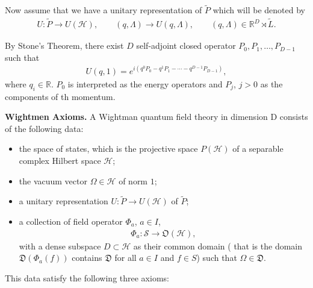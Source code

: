 \documentclass[a4paper,10pt]{amsart}
\newcommand{\HHH}{\mathcal H} %
\newcommand{\SSS}{\mathcal S}
\newcommand{\DDD}{\mathfrak D}
\newcommand{\PPP}{\widetilde{P}}
\newcommand{\LLL}{\widetilde{L}}
\newcommand{\R}{\mathbb R}  %
\begin{document}
Now assume that we have a unitary representation of $\PPP$ which will be 
denoted by
\begin{align*}
    U : \PPP \to U(\HHH), \qquad (q, \Lambda) \to U(q, \Lambda), 
    \qquad (q, \Lambda) \in \R^{D} \rtimes \LLL.
\end{align*}

By Stone's Theorem, there exist $D$ self-adjoint closed operator
$P_0, P_1, \ldots, P_{D-1}$ such that
\begin{align*}
    U(q, 1) = e^{i(q^{0}P_{0} - q^{1}P_1 - \cdots - q^{D-1}P_{D-1})},
\end{align*}
where $q_i \in \R$. $P_0$ is interpreted as the energy operators 
and $P_j$, $j > 0$ as the components of th momentum.

\textbf{Wightmen Axioms.} A Wightman quantum field theory in dimension
D consists of the following data:
\begin{itemize}
    \item the space of states, which is the projective space $P(\HHH)$ of 
        a separable complex Hilbert space $\HHH$;
    \item the vacuum vector $\Omega \in \HHH$ of norm $1$;
    \item a unitary representation $U: \PPP \to U(\HHH)$ of $\PPP$;
    \item a collection of field operator $\Phi_{a}$, $a \in I$,
        \begin{align*}
            \Phi_{a}: \SSS \to \mathfrak{O}(\HHH), 
        \end{align*}
        with a dense subspace $D \subset \HHH$ as their common domain 
        ( that is the domain $\DDD(\Phi_{a}(f))$ contains $\DDD$ 
        for all $a \in I$ and $f \in S$) such that $\Omega \in \DDD$.
\end{itemize}

This data satisfy the following three axioms:
\end{document}
